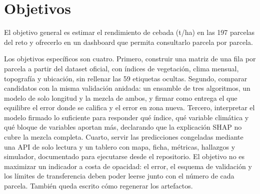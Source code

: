 \section{Objetivos}

El objetivo general es estimar el rendimiento de cebada (t/ha) en las 197 parcelas del reto y ofrecerlo en un dashboard que permita consultarlo parcela por parcela.

Los objetivos específicos son cuatro. Primero, construir una matriz de una fila por parcela a partir del dataset oficial, con índices de vegetación, clima mensual, topografía y ubicación, sin rellenar las 59 etiquetas ocultas. Segundo, comparar candidatos con la misma validación anidada: un ensamble de tres algoritmos, un modelo de solo longitud y la mezcla de ambos, y firmar como entrega el que equilibre el error donde se califica y el error en zona nueva. Tercero, interpretar el modelo firmado lo suficiente para responder qué índice, qué variable climática y qué bloque de variables aportan más, declarando que la explicación SHAP no cubre la mezcla completa. Cuarto, servir las predicciones congeladas mediante una API de solo lectura y un tablero con mapa, ficha, métricas, hallazgos y simulador, documentado para ejecutarse desde el repositorio. El objetivo no es maximizar un indicador a costa de opacidad: el error, el esquema de validación y los límites de transferencia deben poder leerse junto con el número de cada parcela. También queda escrito cómo regenerar los artefactos.
